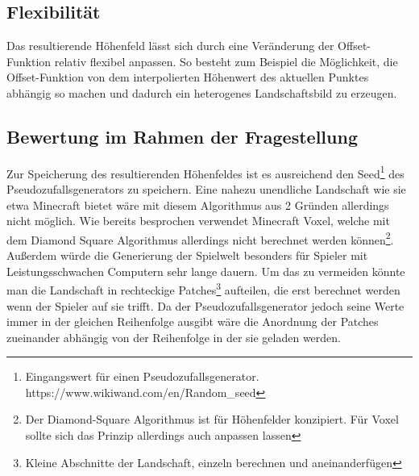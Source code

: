 \subsection{Flexibilität}
Das resultierende Höhenfeld lässt sich durch eine Veränderung der Offset-Funktion relativ flexibel anpassen. So besteht zum Beispiel die Möglichkeit, die Offset-Funktion von dem interpolierten Höhenwert des aktuellen Punktes abhängig so machen und dadurch ein heterogenes Landschaftsbild zu erzeugen.

\subsection{Bewertung im Rahmen der Fragestellung}
Zur Speicherung des resultierenden Höhenfeldes ist es ausreichend den Seed\footnote{Eingangswert für einen Pseudozufallsgenerator. https://www.wikiwand.com/en/Random\_seed} des Pseudozufallsgenerators zu speichern. Eine nahezu unendliche Landschaft wie sie etwa Minecraft bietet wäre mit diesem Algorithmus aus 2 Gründen allerdings nicht möglich. Wie bereits besprochen verwendet Minecraft Voxel, welche mit dem Diamond Square Algorithmus allerdings nicht berechnet werden können\footnote{Der Diamond-Square Algorithmus ist für Höhenfelder konzipiert. Für Voxel sollte sich das Prinzip allerdings auch anpassen lassen}. Außerdem würde die Generierung der Spielwelt besonders für Spieler mit Leistungsschwachen Computern sehr lange dauern. Um das zu vermeiden könnte man die Landschaft in rechteckige Patches\footnote{Kleine Abschnitte der Landschaft, einzeln berechnen und aneinanderfügen} aufteilen, die erst berechnet werden wenn der Spieler auf sie trifft. Da der Pseudozufallsgenerator jedoch seine Werte immer in der gleichen Reihenfolge ausgibt wäre die Anordnung der Patches zueinander abhängig von der Reihenfolge in der sie geladen werden\label{Patches}.

